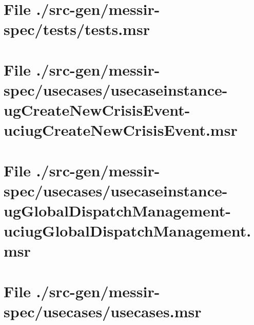 \section[File /src-gen/messir-spec/tests/tests.msr]{File ./src-gen/messir-spec/tests/tests.msr}
\scriptsize

\normalsize
	
\section[File /.../usecaseinstance-ugCreateNewCrisisEvent-uciugCreateNewCrisisEvent.msr]{File ./src-gen/messir-spec/usecases/usecaseinstance-ugCreateNewCrisisEvent-uciugCreateNewCrisisEvent.msr}
\scriptsize

\normalsize
	
\section[File /.../usecaseinstance-ugGlobalDispatchManagement-uciugGlobalDispatchManagement.msr]{File ./src-gen/messir-spec/usecases/usecaseinstance-ugGlobalDispatchManagement-uciugGlobalDispatchManagement.msr}
\scriptsize

\normalsize
	
\section[File /src-gen/messir-spec/usecases/usecases.msr]{File ./src-gen/messir-spec/usecases/usecases.msr}
\scriptsize

\normalsize
	

